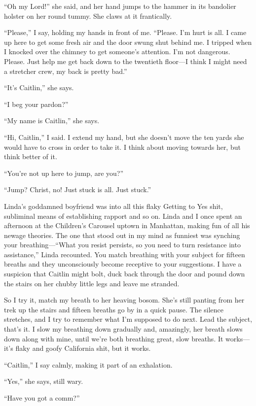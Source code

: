 “Oh my Lord!” she said, and her hand jumps to the hammer in its
bandolier holster on her round tummy. She claws at it frantically.

“Please,” I say, holding my hands in front of me. “Please. I’m hurt
is all. I came up here to get some fresh air and the door swung
shut behind me. I tripped when I knocked over the chimney to get
someone’s attention. I’m not dangerous. Please. Just help me get
back down to the twentieth floor—I think I might need a stretcher
crew, my back is pretty bad.”

“It’s Caitlin,” she says.

“I beg your pardon?”

“My name is Caitlin,” she says.

“Hi, Caitlin,” I said. I extend my hand, but she doesn’t move the
ten yards she would have to cross in order to take it. I think
about moving towards her, but think better of it.

“You’re not up here to jump, are you?”

“Jump? Christ, no! Just stuck is all. Just stuck.”

Linda’s goddamned boyfriend was into all this flaky Getting to Yes
shit, subliminal means of establishing rapport and so on. Linda and
I once spent an afternoon at the Children’s Carousel uptown in
Manhattan, making fun of all his newage theories. The one that
stood out in my mind as funniest was synching your breathing—“What
you resist persists, so you need to turn resistance into
assistance,” Linda recounted. You match breathing with your subject
for fifteen breaths and they unconsciously become receptive to your
suggestions. I have a suspicion that Caitlin might bolt, duck back
through the door and pound down the stairs on her chubby little
legs and leave me stranded.

So I try it, match my breath to her heaving bosom. She’s still
panting from her trek up the stairs and fifteen breaths go by in a
quick pause. The silence stretches, and I try to remember what I’m
supposed to do next. Lead the subject, that’s it. I slow my
breathing down gradually and, amazingly, her breath slows down
along with mine, until we’re both breathing great, slow breaths. It
works—it’s flaky and goofy California shit, but it works.

“Caitlin,” I say calmly, making it part of an exhalation.

“Yes,” she says, still wary.

“Have you got a comm?”

